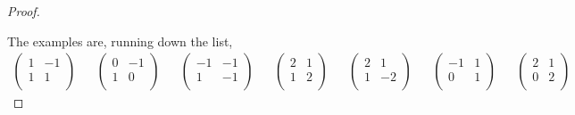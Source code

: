 \documentclass[../psets.tex]{subfiles}
\begin{document}
\begin{enumerate}
\begin{proof}
\begin{enumerate}
        \end{enumerate}
        The examples are, running down the list,
        \begin{align*}
            \begin{pmatrix}
                1 & -1\\
                1 & 1\\
            \end{pmatrix}&&
            \begin{pmatrix}
                0 & -1\\
                1 & 0\\
            \end{pmatrix}&&
            \begin{pmatrix}
                -1 & -1\\
                1 & -1\\
            \end{pmatrix}&&
            \begin{pmatrix}
                2 & 1\\
                1 & 2\\
            \end{pmatrix}&&
            \begin{pmatrix}
                2 & 1\\
                1 & -2\\
            \end{pmatrix}&&
            \begin{pmatrix}
                -1 & 1\\
                0 & 1\\
            \end{pmatrix}&&
            \begin{pmatrix}
                2 & 1\\
                0 & 2\\
            \end{pmatrix}
        \end{align*}
    \end{proof}
\end{enumerate}
\end{document}
